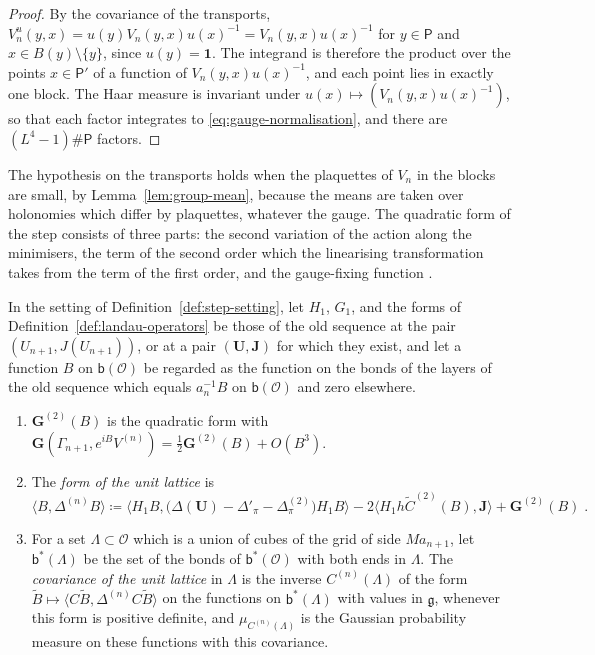 \documentclass[11pt]{preprint}
\newcommand{\id}{\mathbf 1}
\numberwithin{equation}{section}
\begin{document}
\begin{proof}
By the covariance of the transports, $V^u_n(y, x) = u(y)V_n(y, x)u(x)^{-1} = V_n(y, x)u(x)^{-1}$ for $y \in \mathsf P$ and $x \in B(y) \setminus \{ y \}$, since $u(y) = \id$. The integrand is therefore the product over the points $x \in \mathsf P'$ of a function of $V_n(y, x)u(x)^{-1}$, and each point lies in exactly one block. The Haar measure is invariant under $u(x) \mapsto (V_n(y, x)u(x)^{-1})$, so that each factor integrates to \eqref{eq:gauge-normalisation}, and there are $(L^4 - 1)\#\mathsf P$ factors.
\end{proof}

The hypothesis on the transports holds when the plaquettes of $V_n$ in the blocks are small, by Lemma~\ref{lem:group-mean}, because the means are taken over holonomies which differ by plaquettes, whatever the gauge. The quadratic form of the step consists of three parts: the second variation of the action along the minimisers, the term of the second order which the linearising transformation takes from the term of the first order, and the gauge-fixing function \cite[(1.5), p.~261; (2.11), p.~267]{BalabanRG1}.

\begin{definition}\label{def:unit-form}
In the setting of Definition~\ref{def:step-setting}, let $H_1$, $G_1$, and the forms of Definition~\ref{def:landau-operators} be those of the old sequence at the pair $(U_{n+1}, J(U_{n+1}))$, or at a pair $(\mathbf U, \mathbf J)$ for which they exist, and let a function $B$ on $\mathsf b(\mathcal O)$ be regarded as the function on the bonds of the layers of the old sequence which equals $a_n^{-1}B$ on $\mathsf b(\mathcal O)$ and zero elsewhere.
\begin{enumerate}[label=(\roman*)]
\item $\mathbf G^{(2)}(B)$ is the quadratic form with $\mathbf G(\Gamma_{n+1}, e^{iB}V^{(n)}) = \frac{1}{2}\mathbf G^{(2)}(B) + O(B^3)$.
\item The \emph{form of the unit lattice} is
\begin{equation}\label{eq:unit-form}
    \langle B, \Delta^{(n)}B\rangle \coloneqq \bigl\langle H_1B, \bigl(\Delta(\mathbf U) - \Delta'_\pi - \Delta^{(2)}_\pi\bigr)H_1B\bigr\rangle - 2\bigl\langle H_1h\tilde C^{(2)}(B), \mathbf J\bigr\rangle + \mathbf G^{(2)}(B)\;.
\end{equation}
\item For a set $\Lambda \subset \mathcal O$ which is a union of cubes of the grid of side $Ma_{n+1}$, let $\mathsf b^*(\Lambda)$ be the set of the bonds of $\mathsf b^*(\mathcal O)$ with both ends in $\Lambda$. The \emph{covariance of the unit lattice} in $\Lambda$ is the inverse $C^{(n)}(\Lambda)$ of the form $\tilde B \mapsto \langle C\tilde B, \Delta^{(n)}C\tilde B\rangle$ on the functions on $\mathsf b^*(\Lambda)$ with values in $\mathfrak g$, whenever this form is positive definite, and $\mu_{C^{(n)}(\Lambda)}$ is the Gaussian probability measure on these functions with this covariance.
\end{enumerate}
\end{definition}
\end{document}
